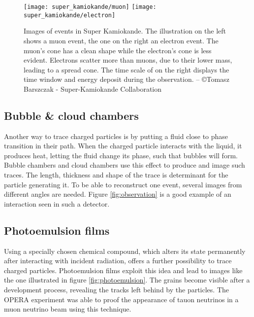 \begin{figure*}
  \centering
  \texttt{[image: super\_kamiokande/muon]}
  \hspace*{1em}
  \texttt{[image: super\_kamiokande/electron]}
  \caption{%
    Images of events in Super Kamiokande.
    The illustration on the left shows a muon event, the one on the right an electron event.
    The muon's cone has a clean shape while the electron's cone is less evident.
    Electrons scatter more than muons, due to their lower mass, leading to a spread cone.
    The time scale of on the right displays the time window and energy deposit during the observation.
    -- \copyright Tomasz Barszczak - Super-Kamiokande Collaboration
  }
  \label{fig:super_kamiokande_events}
\end{figure*}

\subsection{Bubble \& cloud chambers} Another way to trace charged particles is by putting a fluid close to phase transition in their path.
When the charged particle interacts with the liquid, it produces heat, letting the fluid change its phase, such that bubbles will form.
Bubble chambers and cloud chambers use this effect to produce and image such traces.
The length, thickness and shape of the trace is determinant for the particle generating it.
To be able to reconstruct one event, several images from different angles are needed.
Figure \ref{fig:observation} is a good example of an interaction seen in such a detector.

\subsection{Photoemulsion films} Using a specially chosen chemical compound, which alters its state permanently after interacting with incident radiation, offers a further possibility to trace charged particles.
Photoemulsion films exploit this idea and lead to images like the one illustrated in figure \ref{fig:photoemulsion}.
The grains become visible after a development process, revealing the tracks left behind by the particles.
The OPERA experiment was able to proof the appearance of tauon neutrinos in a muon neutrino beam using this technique\cite{Ereditato2016116}.

